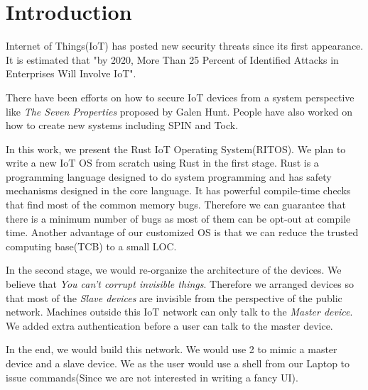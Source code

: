 \section{Introduction}


Internet of Things(IoT) has posted new security threats since its first appearance. 
It is estimated that "by 2020, More Than 25 Percent of Identified Attacks in Enterprises Will Involve IoT"\cite{gartner2016gartner}.


There have been efforts on how to secure IoT devices from a system perspective like \textit{The Seven Properties}\cite{hunt2017the} proposed by Galen Hunt.
People have also worked on how to create new systems including SPIN\cite{hesselman2017spin} and Tock\cite{levy2017tock}.



In this work, we present the Rust IoT Operating System(RITOS).
We plan to write a new IoT OS from scratch using Rust in the first stage.
Rust is a programming language designed to do system programming and has safety mechanisms designed in the core language.
It has powerful compile-time checks that find most of the common memory bugs.
Therefore we can guarantee that there is a minimum number of bugs as most of them can be opt-out at compile time. 
Another advantage of our customized OS is that we can reduce the trusted computing base(TCB) to a small LOC.

In the second stage, we would re-organize the architecture of the devices.
We believe that \textit{You can't corrupt invisible things}.
Therefore we arranged devices so that most of the \textit{Slave devices} are invisible from the perspective of the public network.
Machines outside this IoT network can only talk to the \textit{Master device}.
We added extra authentication before a user can talk to the master device.


In the end, we would build this network. 
We would use 2 \rpi to mimic a master device and a slave device. 
We as the user would use a shell from our Laptop to issue commands(Since we are not interested in writing a fancy UI).
